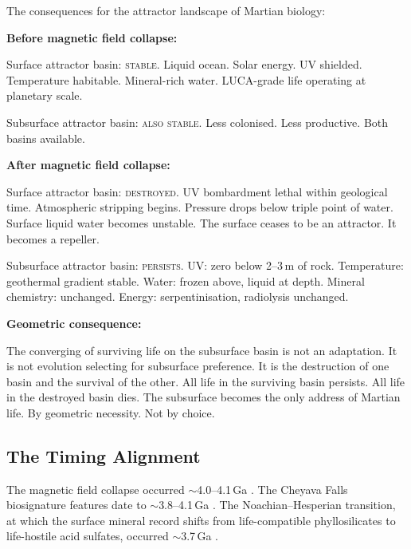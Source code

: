 \documentclass[11pt, a4paper]{article}
\begin{document}
The consequences for the attractor landscape
of Martian biology:

\begin{mdframed}[
  linecolor=rulecolor,
  linewidth=0.8pt,
  innertopmargin=0.5em,
  innerbottommargin=0.5em,
  innerleftmargin=1em,
  innerrightmargin=1em
]
\textbf{Before magnetic field collapse:}

Surface attractor basin: \textsc{stable}.
Liquid ocean. Solar energy. UV shielded.
Temperature habitable. Mineral-rich water.
LUCA-grade life operating at planetary scale.

Subsurface attractor basin: \textsc{also stable}.
Less colonised. Less productive.
Both basins available.

\medskip
\textbf{After magnetic field collapse:}

Surface attractor basin: \textsc{destroyed}.
UV bombardment lethal within geological time.
Atmospheric stripping begins.
Pressure drops below triple point of water.
Surface liquid water becomes unstable.
The surface ceases to be an attractor.
It becomes a repeller.

Subsurface attractor basin: \textsc{persists}.
UV: zero below 2--3\,m of rock.
Temperature: geothermal gradient stable.
Water: frozen above, liquid at depth.
Mineral chemistry: unchanged.
Energy: serpentinisation, radiolysis unchanged.

\medskip
\textbf{Geometric consequence:}

The converging of surviving life on the
subsurface basin is not an adaptation.
It is not evolution selecting for subsurface
preference. It is the destruction of one
basin and the survival of the other.
All life in the surviving basin persists.
All life in the destroyed basin dies.
The subsurface becomes the only address
of Martian life. By geometric necessity.
Not by choice.
\end{mdframed}

\subsection{The Timing Alignment}

The magnetic field collapse occurred
$\sim$4.0--4.1\,Ga \cite{marsfield}.
The Cheyava Falls biosignature features date
to $\sim$3.8--4.1\,Ga \cite{hurowitz2025}.
The Noachian--Hesperian transition, at which
the surface mineral record shifts from
life-compatible phyllosilicates to
life-hostile acid sulfates, occurred
$\sim$3.7\,Ga \cite{bibring2006}.
\end{document}
